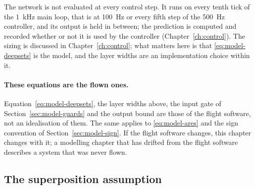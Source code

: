 The network is not evaluated at every control step. It runs on every tenth tick of the
\SI{1}{\kilo\hertz} main loop, that is at \SI{100}{\hertz} or every fifth step of the
\SI{500}{\hertz} controller, and its output is held in between; the prediction is computed and
recorded whether or not it is used by the controller (Chapter~\ref{ch:control}). The sizing is discussed in
Chapter~\ref{ch:control}; what matters here is that \eqref{eq:model-deepsets} is the model, and the
layer widths are an implementation choice within it.

\paragraph{These equations are the flown ones.} Equation~\eqref{eq:model-deepsets}, the layer widths
above, the input gate of Section~\ref{sec:model-guards} and the output bound are those of the
flight software, not an idealisation of them. The same applies to \eqref{eq:model-ares} and the
sign convention of Section~\ref{sec:model-sign}. If the flight software changes, this chapter
changes with it; a modelling chapter that has drifted from the flight software describes a system
that was never flown.

\subsection{The superposition assumption}
\label{sec:model-superposition}

